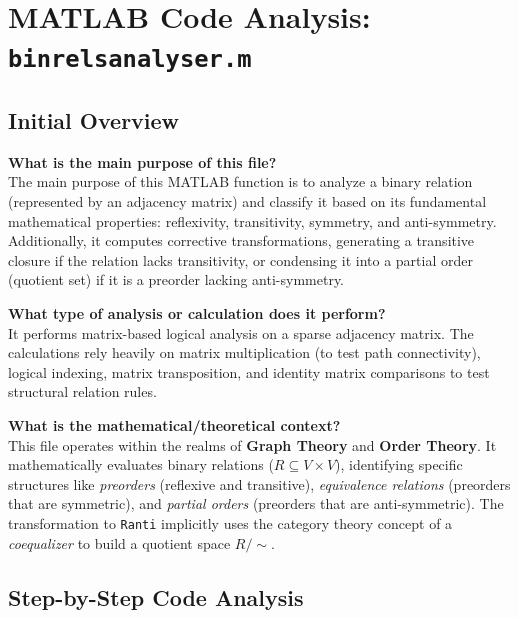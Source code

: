 
\chapter{MATLAB Code Analysis: \texttt{binrelsanalyser.m}}
\author{Expert Software Engineer}
\date{\today}
\maketitle

\section{Initial Overview}

\textbf{What is the main purpose of this file?} \\
The main purpose of this MATLAB function is to analyze a binary relation (represented by an adjacency matrix) and classify it based on its fundamental mathematical properties: reflexivity, transitivity, symmetry, and anti-symmetry. Additionally, it computes corrective transformations, generating a transitive closure if the relation lacks transitivity, or condensing it into a partial order (quotient set) if it is a preorder lacking anti-symmetry.

\textbf{What type of analysis or calculation does it perform?} \\
It performs matrix-based logical analysis on a sparse adjacency matrix. The calculations rely heavily on matrix multiplication (to test path connectivity), logical indexing, matrix transposition, and identity matrix comparisons to test structural relation rules.

\textbf{What is the mathematical/theoretical context?} \\
This file operates within the realms of \textbf{Graph Theory} and \textbf{Order Theory}. It mathematically evaluates binary relations ($R \subseteq V \times V$), identifying specific structures like \textit{preorders} (reflexive and transitive), \textit{equivalence relations} (preorders that are symmetric), and \textit{partial orders} (preorders that are anti-symmetric). The transformation to \texttt{Ranti} implicitly uses the category theory concept of a \textit{coequalizer} to build a quotient space $R/{\sim}$.

\vspace{1em}

\vspace{1em}

\section{Step-by-Step Code Analysis}

